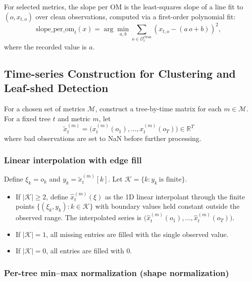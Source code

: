 For selected metrics, the slope per OM is the least-squares slope of a line fit to $(o, x_{t,o})$ over clean observations,
computed via a first-order polynomial fit:
\begin{equation}
\mathrm{slope\_per\_om}_t(x) = \arg\min_{a,b}\sum_{o\in\mathcal{O}^{\mathrm{clean}}_t} (x_{t,o} - (a\,o + b))^2,
\end{equation}
where the recorded value is $a$.

\subsection{Time-series Construction for Clustering and Leaf-shed Detection}

For a chosen set of metrics $\mathcal{M}$, construct a tree-by-time matrix for each $m\in\mathcal{M}$.
For a fixed tree $t$ and metric $m$, let
\begin{equation}
\tilde{x}^{(m)}_{t} = \bigl( x^{(m)}_{t}(o_{1}),\dots,x^{(m)}_{t}(o_{T})\bigr)\in\mathbb{R}^T
\end{equation}
where bad observations are set to NaN before further processing.

\subsubsection{Linear interpolation with edge fill}

Define $\xi_k=o_k$ and $y_k=\tilde{x}^{(m)}_{t}[k]$.
Let $\mathcal{K}=\{k: y_k\ \text{is finite}\}$.

\begin{itemize}[leftmargin=*, itemsep=2pt]
\item If $|\mathcal{K}|\ge 2$, define $\hat{x}^{(m)}_{t}(\xi)$ as the 1D linear interpolant through the finite points
$\{(\xi_k, y_k): k\in\mathcal{K}\}$ with boundary values held constant outside the observed range.
The interpolated series is
$\bigl(\hat{x}^{(m)}_{t}(o_{1}),\dots,\hat{x}^{(m)}_{t}(o_{T})\bigr)$.
\item If $|\mathcal{K}|=1$, all missing entries are filled with the single observed value.
\item If $|\mathcal{K}|=0$, all entries are filled with $0$.
\end{itemize}

\subsubsection{Per-tree min--max normalization (shape normalization)}

